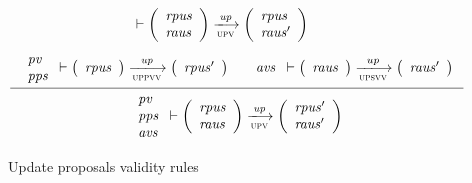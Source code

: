 \begin{figure}[htb]
\begin{equation}
{{      }
      \vdash
      {
        \left(
          \begin{array}{l}
            \var{rpus}\\
            \var{raus}
          \end{array}
        \right)
      }
      \trans{upv}{\var{up}}
      {
        \left(
          \begin{array}{l}
            \var{rpus}\\
            \var{raus'}
          \end{array}
        \right)
      }
    }
  \end{equation}
  \nextdef
  \begin{equation}
    \label{eq:rule:up-validity-pu-su}
    \inference
    {
      {
        \begin{array}{l}
          \var{pv}\\
          \var{pps}
        \end{array}
      }
      \vdash
      {
        \left(
          \begin{array}{l}
            \var{rpus}
          \end{array}
        \right)
      }
      \trans{uppvv}{\var{up}}
      {
        \left(
          \begin{array}{l}
            \var{rpus'}
          \end{array}
        \right)
      }
      &
      {
        \begin{array}{l}
          \var{avs}
        \end{array}
      }
      \vdash
      {
        \left(
          \begin{array}{l}
            \var{raus}
          \end{array}
        \right)
      }
      \trans{upsvv}{up}
      {
        \left(
          \begin{array}{l}
            \var{raus'}
          \end{array}
        \right)
      }
    }
    {
      {
        \begin{array}{l}
          \var{pv}\\
          \var{pps}\\
          \var{avs}
        \end{array}
      }
      \vdash
      {
        \left(
          \begin{array}{l}
            \var{rpus}\\
            \var{raus}
          \end{array}
        \right)
      }
      \trans{upv}{\var{up}}
      {
        \left(
          \begin{array}{l}
            \var{rpus'}\\
            \var{raus'}
          \end{array}
        \right)
      }
    }
  \end{equation}
  \caption{Update proposals validity rules}
  \label{fig:rules:up-validity}
\end{figure}

